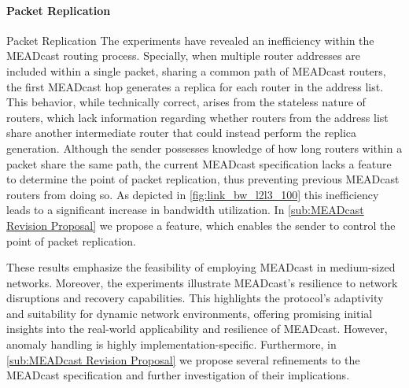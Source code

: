 \begin{itemize}
    \paragraph{Packet Replication} %
    \label{par:Discussion Packet Replication}
Packet Replication    The experiments have revealed an inefficiency within the MEADcast routing
        process.
    Specially, when multiple router addresses are included within a single
        packet, sharing a common path of MEADcast routers, the first MEADcast
        hop generates a replica for each router in the address list.
    This behavior, while technically correct, arises from the stateless nature
        of routers, which lack information regarding whether routers from the
        address list share another intermediate router that could instead
        perform the replica generation.
    Although the sender possesses knowledge of how long routers within a packet
        share the same path, the current MEADcast specification lacks a feature
        to determine the point of packet replication, thus preventing previous
        MEADcast routers from doing so.
    As depicted in \autoref{fig:link_bw_l2l3_100} this inefficiency leads to a
        significant increase in bandwidth utilization.
    In \autoref{sub:MEADcast Revision Proposal} we propose a feature, which
        enables the sender to control the point of packet replication.

    These results emphasize the feasibility of employing MEADcast in
        medium-sized networks.
    Moreover, the experiments illustrate MEADcast's resilience to network
        disruptions and recovery capabilities.
    This highlights the protocol's adaptivity and suitability for dynamic
        network environments, offering promising initial insights into the
        real-world applicability and resilience of MEADcast.
    However, anomaly handling is highly implementation-specific.
    Furthermore, in \autoref{sub:MEADcast Revision Proposal} we propose several
        refinements to the MEADcast specification and further investigation of
        their implications.
\end{itemize}

